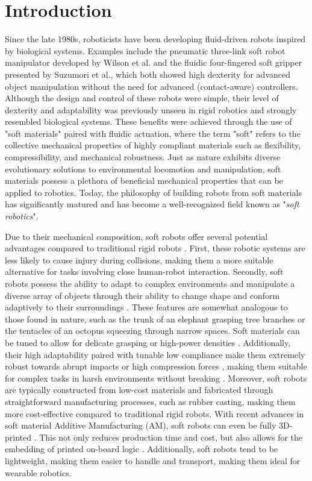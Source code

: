 \section{Introduction}
\label{sec:introduction}
Since the late 1980s, roboticists have been developing fluid-driven robots inspired by biological systems. Examples include the pneumatic three-link soft robot manipulator developed by Wilson et al.\cite{Wilson1989Jun,Weisburd1988,Wilson2007} and the fluidic four-fingered soft gripper presented by Suzumori et al.\cite{Suzumori1991,Suzumori1992}, which both showed high dexterity for advanced object manipulation without the need for advanced (contact-aware) controllers. Although the design and control of these robots were simple, their level of dexterity and adaptability was previously unseen in rigid robotics and strongly resembled biological systems. These benefits were achieved through the use of "soft materials" paired with fluidic actuation, where the term "soft" refers to the collective mechanical properties of highly compliant materials such as flexibility, compressibility, and mechanical robustness. Just as nature exhibits diverse evolutionary solutions to environmental locomotion and manipulation, soft materials possess a plethora of beneficial mechanical properties that can be applied to robotics. Today, the philosophy of building robots from soft materials has significantly matured and has become a well-recognized field known as "\textit{soft robotics}".

Due to their mechanical composition, soft robots offer several potential advantages compared to traditional rigid robots \cite{Rus2015}. First, these robotic systems are less likely to cause injury during collisions, making them a more suitable alternative for tasks involving close human-robot interaction. Secondly, soft robots possess the ability to adapt to complex environments and manipulate a diverse array of objects through their ability to change shape and conform adaptively to their surroundings \cite{Hughes2016Nov,Marchese2015}. These features are somewhat analogous to those found in nature, such as the trunk of an elephant grasping tree branches or the tentacles of an octopus squeezing through narrow spaces. Soft materials can be tuned to allow for delicate grasping \cite{Sinatra2019Aug,Galloway2016} or high-power densities \cite{Li2017Dec}. Additionally, their high adaptability paired with tunable low compliance make them extremely robust towards abrupt impacts or high compression forces \cite{Bartlett2015Jul}, making them suitable for complex tasks in harsh environments without breaking \cite{Hawkes2017,Li2021Mar,Tolley2014Sep}. Moreover, soft robots are typically constructed from low-cost materials and fabricated through straightforward manufacturing processes, such as rubber casting, making them more cost-effective compared to traditional rigid robots. With recent advances in soft material Additive Manufacturing (AM), soft robots can even be fully 3D-printed \cite{Wallin2018Jun,Xavier2022Jun}. This not only reduces production time and cost, but also allows for the embedding of printed on-board logic \cite{Hubbard2021,Wehner2016}. Additionally, soft robots tend to be lightweight, making them easier to handle and transport, making them ideal for wearable robotics.

